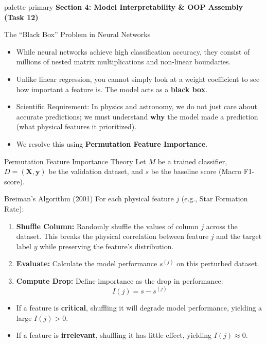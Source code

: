 \documentclass[9pt]{beamer}
\begin{document}
\begin{frame}[plain]
  \vfill
  \centering
  \begin{beamercolorbox}[sep=8pt,center,shadow=true,rounded=true]{palette primary}
    \textbf{Section 4: Model Interpretability \& OOP Assembly (Task 12)}
  \end{beamercolorbox}
  \vfill
\end{frame}

\begin{frame}{The ``Black Box'' Problem in Neural Networks}
  \begin{itemize}
    \item While neural networks achieve high classification accuracy, they consist of millions of nested matrix multiplications and non-linear boundaries.
    \item Unlike linear regression, you cannot simply look at a weight coefficient to see how important a feature is. The model acts as a \textbf{black box}.
    \item \alert{Scientific Requirement:} In physics and astronomy, we do not just care about accurate predictions; we must understand \textbf{why} the model made a prediction (what physical features it prioritized).
    \item We resolve this using \textbf{Permutation Feature Importance}.
  \end{itemize}
\end{frame}

\begin{frame}{Permutation Feature Importance Theory}
  Let $M$ be a trained classifier, $D = (\mathbf{X}, \mathbf{y})$ be the validation dataset, and $s$ be the baseline score (Macro F1-score).
  \begin{block}{Breiman's Algorithm (2001)}
    For each physical feature $j$ (e.g., Star Formation Rate):
    \begin{enumerate}
      \item \textbf{Shuffle Column:} Randomly shuffle the values of column $j$ across the dataset. This breaks the physical correlation between feature $j$ and the target label $y$ while preserving the feature's distribution.
      \item \textbf{Evaluate:} Calculate the model performance $s^{(j)}$ on this perturbed dataset.
      \item \textbf{Compute Drop:} Define importance as the drop in performance:
        $$I(j) = s - s^{(j)}$$
    \end{enumerate}
  \end{block}
  \begin{itemize}
    \item If a feature is \textbf{critical}, shuffling it will degrade model performance, yielding a large $I(j) > 0$.
    \item If a feature is \textbf{irrelevant}, shuffling it has little effect, yielding $I(j) \approx 0$.
  \end{itemize}
\end{frame}
\end{document}
